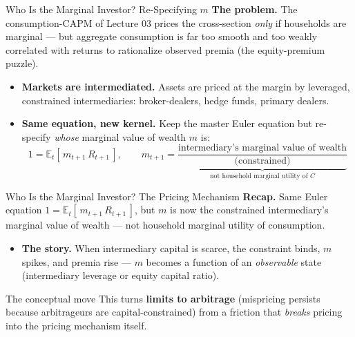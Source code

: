 \documentclass{beamer}
\newcommand{\E}{\mathbb{E}}
\begin{document}
\begin{frame}{Who Is the Marginal Investor? Re-Specifying $m$}
\textbf{The problem.} The consumption-CAPM of Lecture 03 prices the cross-section \emph{only} if households are marginal --- but aggregate consumption is far too smooth and too weakly correlated with returns to rationalize observed premia (the equity-premium puzzle).
\begin{itemize}
  \item \textbf{Markets are intermediated.} Assets are priced at the margin by \alert{leveraged, constrained intermediaries}: broker-dealers, hedge funds, primary dealers.
  \item \textbf{Same equation, new kernel.} Keep the master Euler equation but re-specify \emph{whose} marginal value of wealth $m$ is:
  \begin{equation*}
    1 = \E_t\!\left[\, m_{t+1}\, R_{t+1}\,\right],
    \qquad
    m_{t+1} = \underbrace{\frac{\text{intermediary's marginal value of wealth}}{\text{(constrained)}}}_{\text{not household marginal utility of } C}
  \end{equation*}
\end{itemize}
\end{frame}

\begin{frame}{Who Is the Marginal Investor? The Pricing Mechanism}
\textbf{Recap.} Same Euler equation $1 = \E_t[\, m_{t+1}\, R_{t+1}\,]$, but $m$ is now the \alert{constrained intermediary's} marginal value of wealth --- not household marginal utility of consumption.
\begin{itemize}
  \item \textbf{The story.} When intermediary capital is \alert{scarce}, the constraint binds, $m$ spikes, and premia rise --- $m$ becomes a function of an \textit{observable} state (intermediary leverage or equity capital ratio).
\end{itemize}
\begin{block}{The conceptual move}
This turns \textbf{limits to arbitrage} (mispricing persists because arbitrageurs are capital-constrained) from a friction that \emph{breaks} pricing into the pricing \alert{mechanism itself}.
\end{block}
\end{frame}
\end{document}
